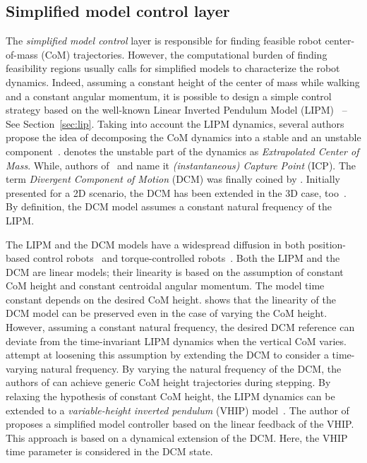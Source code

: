 \subsection{Simplified model control layer\label{sec:soa_simplified_model_control_layer}}
The \emph{simplified model control} layer is responsible for finding feasible robot center-of-mass (CoM) trajectories. However, the computational burden of finding feasibility regions usually calls for simplified models to characterize the robot dynamics. Indeed, assuming a constant height of the center of mass while walking and a constant angular momentum, it is possible to design a simple control strategy based on the well-known Linear Inverted Pendulum Model (LIPM)~\citep{Kajita2001} -- See
Section~\ref{sec:lip}. 
Taking into account the LIPM dynamics, several authors propose the idea of decomposing the CoM dynamics into a stable and an unstable component~\citep{Pratt2006,Hof2008,koolen2012capturability,pratt2012capturability,Englsberger2011,Takenaka2009RealGeneration-}. \cite{Hof2008} denotes the unstable part of the dynamics as \emph{Extrapolated Center of Mass}. While, authors of~\citep{pratt2012capturability} and \citep{koolen2012capturability} name it \emph{(instantaneous) Capture
Point} (ICP). The term \emph{Divergent Component of Motion} (DCM) was finally coined by \cite{Takenaka2009RealGeneration-}. Initially presented for a 2D scenario, the DCM has been extended in the 3D case, too~\citep{Englsberger2013,Englsberger2015}.
By definition, the DCM model assumes a constant natural frequency of the LIPM. 
\par
The LIPM and the DCM models have a widespread diffusion in both position-based control robots~\citep{Ramuzat2021ComparisonTALOS,Shafiee-Ashtiani2017a,Leng2020UniversalProgramming,Kamioka2018SimultaneousMotion} and torque-controlled robots~\citep{Hopkins2015,Stephens2010PushJoints,koolen2012capturability,pratt2012capturability, Dafarra2016Torque-controlledRobot,Griffin2016, Englsberger2018,Englsberger2019}.
Both the LIPM and the DCM are linear models; their linearity is based on the assumption of constant
CoM height and constant centroidal angular momentum. The model time constant depends on the desired
CoM height. \cite{Englsberger2013} shows that the linearity of the DCM model can be preserved even in the case
of varying the CoM height. However, assuming a constant natural frequency, the desired DCM reference can
deviate from the time-invariant LIPM dynamics when the vertical CoM varies.
\cite{Hopkins2015} attempt at loosening this assumption by extending the DCM to consider a time-varying
natural frequency.  By varying the natural frequency of the DCM, the authors of \citep{Hopkins2015}
can achieve generic CoM height trajectories during stepping.
By relaxing the hypothesis of constant CoM height, the LIPM dynamics can be extended to a
\emph{variable-height inverted pendulum} (VHIP) model~\citep{Koolen2016BalanceContact}. The author of \citep{Caron2020BipedModel} proposes a simplified model controller based on the linear feedback of the VHIP. This approach is based on a dynamical extension of the DCM. Here, the VHIP time parameter is considered in the DCM state.

